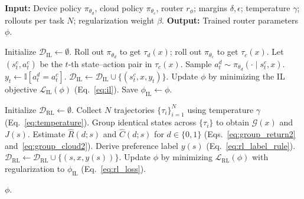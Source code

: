 \documentclass{article}
\newcommand{\name}{Hera\xspace}
\begin{document}
\begin{algorithm}[h]
\caption{\name:Two-Stage Training for Step-Level Device--Cloud LLM Agent Coordination}
\label{alg:hera}
\begin{algorithmic}[1]
\STATE \textbf{Input:} Device policy $\pi_{\theta_d}$, cloud policy $\pi_{\theta_c}$, router $r_\phi$; margins $\delta,\epsilon$; temperature $\gamma$; rollouts per task $N$; regularization weight $\beta$.
\STATE \textbf{Output:} Trained router parameters $\phi$.

\STATE Initialize $\mathcal{D}_{\mathrm{IL}} \leftarrow \emptyset$.
    \STATE Roll out $\pi_{\theta_d}$ to get $\tau_d(x)$; roll out $\pi_{\theta_c}$ to get $\tau_c(x)$.
            \STATE Let $(s_t^c,a_t^c)$ be the $t$-th state--action pair in $\tau_c(x)$.
            \STATE Sample $a_t^d \sim \pi_{\theta_d}(\cdot \mid s_t^c,x)$.
            \STATE $y_t \leftarrow \mathbb{I}[a_t^d = a_t^c]$.
            \STATE $\mathcal{D}_{\mathrm{IL}} \leftarrow \mathcal{D}_{\mathrm{IL}} \cup \{(s_t^c,x,y_t)\}$.
        \ENDFOR
    \ENDIF
\ENDFOR
\STATE Update $\phi$ by minimizing the IL objective $\mathcal{L}_{\mathrm{IL}}(\phi)$ (Eq.~\ref{eq:il}).
\STATE Save $\phi_{\mathrm{IL}} \leftarrow \phi$.

    \STATE Initialize $\mathcal{D}_{\mathrm{RL}} \leftarrow \emptyset$.
        \STATE Collect $N$ trajectories $\{\tau_i\}_{i=1}^N$ using temperature $\gamma$ (Eq.~\ref{eq:temperature}).
        \STATE Group identical states across $\{\tau_i\}$ to obtain $\mathcal{G}(x)$ and $J(s)$.
            \STATE Estimate $\widehat{R}(d;s)$ and $\widehat{C}(d;s)$ for $d\in\{0,1\}$ (Eqs.~\ref{eq:group_return2} and~\ref{eq:group_cloud2}).
            \STATE Derive preference label $y(s)$ (Eq.~\ref{eq:rl_label_rule}).
            \STATE $\mathcal{D}_{\mathrm{RL}} \leftarrow \mathcal{D}_{\mathrm{RL}} \cup \{(s,x,y(s))\}$.
        \ENDFOR
    \ENDFOR
    \STATE Update $\phi$ by minimizing $\mathcal{L}_{\mathrm{RL}}(\phi)$ with regularization to $\phi_{\mathrm{IL}}$ (Eq.~\ref{eq:rl_loss}).
\ENDFOR

\RETURN $\phi$.
\end{algorithmic}
\end{algorithm}


\end{document}
